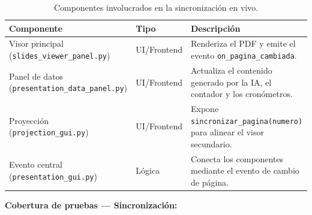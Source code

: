 \documentclass[12pt,letterpaper]{article}
\begin{document}
\begin{table}[H]
    \centering
    \begin{tabular}{|L{0.34\textwidth}|L{0.18\textwidth}|L{0.38\textwidth}|}
        \hline
        \textbf{Componente} & \textbf{Tipo} & \textbf{Descripción} \\ \hline
        Visor principal (\texttt{slides\_viewer\_panel.py}) & UI/Frontend & Renderiza el PDF y emite el evento \texttt{on\_pagina\_cambiada}. \\ \hline
        Panel de datos (\texttt{presentation\_data\_panel.py}) & UI/Frontend & Actualiza el contenido generado por la IA, el contador y los cronómetros. \\ \hline
        Proyección (\texttt{projection\_gui.py}) & UI/Frontend & Expone \texttt{sincronizar\_pagina(numero)} para alinear el visor secundario. \\ \hline
        Evento central (\texttt{presentation\_gui.py}) & Lógica & Conecta los componentes mediante el evento de cambio de página. \\ \hline
    \end{tabular}
    \caption{Componentes involucrados en la sincronización en vivo.}
    \label{tab:componentes-modulo-sincronizacion}
\end{table}

\textbf{Cobertura de pruebas --- Sincronización:}
\end{document}
